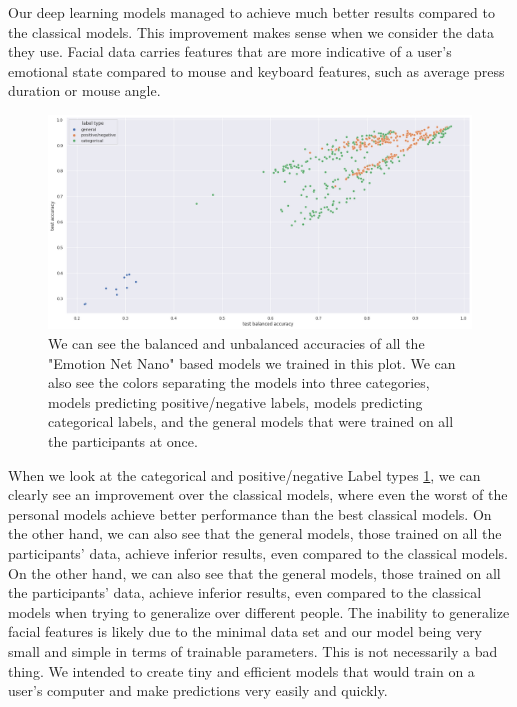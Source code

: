     Our deep learning models managed to achieve much better results compared to the classical models. 
    This improvement makes sense when we consider the data they use. Facial data carries features that are more 
    indicative of a user's emotional state compared to mouse and keyboard features, such as average press duration or mouse angle.

    \begin{figure}[!htp]
        \centering
        \includegraphics[width=14cm]{figures/results/nn_acc}   
        \caption{We can see the balanced and unbalanced accuracies of all the "Emotion Net Nano" based models we trained in this plot.
        We can also see the colors separating the models into three categories, models predicting positive/negative labels, models predicting
        categorical labels, and the general models that were trained on all the participants at once.}
        \label{fig:nn_acc} 
    \end{figure}

    When we look at the categorical and positive/negative Label types \ref{fig:nn_acc}, we can clearly see an improvement over 
    the classical models, where even the worst of the personal models achieve better performance than the best classical models.
    On the other hand, we can also see that the general models, those trained on all the participants' data, achieve inferior results, 
    even compared to the classical models. On the other hand, we can also see that the general models, 
    those trained on all the participants' data, achieve inferior results, even compared to the classical models when trying 
    to generalize over different people. The inability to generalize facial features is likely due to the minimal data 
    set and our model being very small and simple in terms of trainable parameters. This is not necessarily a bad thing. 
    We intended to create tiny and efficient models that would train on a user's computer and make predictions very easily and quickly.

